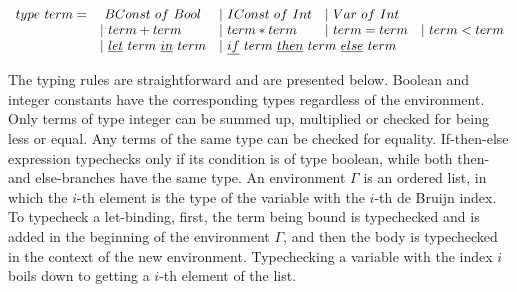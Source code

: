 
\[\begin{array}{lllll}
  type \ term = &\ BConst \ of \ Bool &| \ IConst \ of \ Int &| \ Var \ of \ Int & \\
  & | \ term + term &| \ term * term &| \ term = term &| \ term < term \\
  &| \ \underline{let} \ term \ \underline{in} \ term 
  &\multicolumn{2}{l}{| \ \underline{if} \ term \ \underline{then} \ term \ \underline{else} \ term} &
\end{array}\]

The typing rules are straightforward and are presented below.
Boolean and integer constants have the corresponding types regardless of the environment.
Only terms of type integer can be summed up, multiplied or checked for being less or equal.
Any terms of the same type can be checked for equality.
If-then-else expression typechecks only if its condition is of type boolean, while both then- and else-branches have the same type.
An environment $\Gamma$ is an ordered list, in which the $i$-th element is the type of the variable with the $i$-th de Bruijn index.
To typecheck a let-binding, first, the term being bound is typechecked and is added in the beginning of the environment $\Gamma$, and then the body is typechecked in the context of the new environment.
Typechecking a variable with the index $i$ boils down to getting a $i$-th element of the list.

